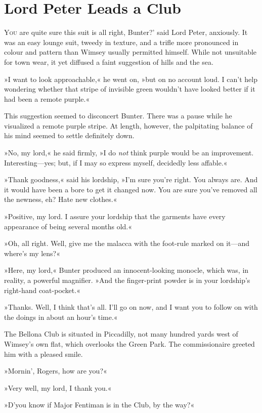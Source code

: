 \chapter{Lord Peter Leads a Club}
\lettrine[lines=4,ante=‘]{Y}{ou} are quite sure this suit is all right, Bunter?' said Lord Peter, anxiously. It was an easy lounge suit, tweedy in texture, and a trifle more pronounced in colour and pattern than Wimsey usually permitted himself. While not unsuitable for town wear, it yet diffused a faint suggestion of hills and the sea.

»I want to look approachable,« he went on, »but on no account loud. I can't help wondering whether that stripe of invisible green wouldn't have looked better if it had been a remote purple.«

This suggestion seemed to disconcert Bunter. There was a pause while he visualized a remote purple stripe. At length, however, the palpitating balance of his mind seemed to settle definitely down.

»No, my lord,« he said firmly, »I do \textit{not} think purple would be an improvement. Interesting—yes; but, if I may so express myself, decidedly less affable.«

»Thank goodness,« said his lordship, »I'm sure you're right. You always are. And it would have been a bore to get it changed now. You are sure you've removed all the newness, eh? Hate new clothes.«

»Positive, my lord. I assure your lordship that the garments have every appearance of being several months old.«

»Oh, all right. Well, give me the malacca with the foot-rule marked on it—and where's my lens?«

»Here, my lord,« Bunter produced an innocent-looking monocle, which was, in reality, a powerful magnifier. »And the finger-print powder is in your lordship's right-hand coat-pocket.«

»Thanks. Well, I think that's all. I'll go on now, and I want you to follow on with the doings in about an hour's time.«

The Bellona Club is situated in Piccadilly, not many hundred yards west of Wimsey's own flat, which overlooks the Green Park. The commissionaire greeted him with a pleased smile.

»Mornin', Rogers, how are you?«

»Very well, my lord, I thank you.«

»D'you know if Major Fentiman is in the Club, by the way?«

